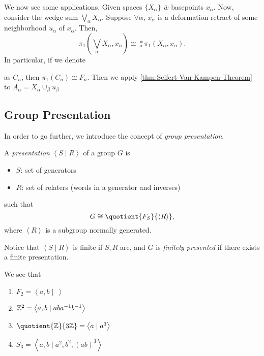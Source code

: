 \begin{eg}
	We now see some applications. Given spaces \(\{X_\alpha \}\) \(\overline{w} \) basepoints \(x_\alpha \). Now, consider
	the wedge sum \(\bigvee\limits_\alpha X_\alpha \). Suppose \(\forall \alpha\), \(x_\alpha \) is a deformation retract of
	some neighborhood \(u_\alpha \) of \(x_\alpha \). Then,
	\[
		\pi _1\left(\bigvee_\alpha X_\alpha , x_\alpha \right) \cong \underset{\alpha }{\ast}\pi _1\left(X_\alpha , x_\alpha \right).
	\]
	In particular, if we denote
	\begin{figure}[H]
		\centering
		\label{fig:eg:Seifert-Van-Kampen-Thm}
	\end{figure}

	as \(C_n\), then \(\pi _1(C_n)\cong F_n\). Then we apply \autoref{thm:Seifert-Van-Kampen-Theorem} to \(A_\alpha = X_\alpha \cup_{\beta }u_\beta \)
\end{eg}

\subsection{Group Presentation}
In order to go further, we introduce the concept of \emph{group presentation}.
\begin{definition}\label{def:group-presentation}
	A \emph{presentation} \(\left< S \mid R \right> \) of a group \(G\) is
	\begin{itemize}
		\item \(S\): set of generators
		\item \(R\): set of relaters (words in a generator and inverses)
	\end{itemize}
	such that
	\[
		G\cong \quotient{F_S}{\left< R \right>},
	\]
	where \(\left< R \right> \) is a subgroup normally generated.

	\par Notice that \(\left< S \mid R \right> \) is finite if \(S, R\) are, and \(G\) is \emph{finitely presented} if
	there exists a finite presentation.
\end{definition}
\begin{eg}
	We see that
	\begin{enumerate}
		\item \(F_2 = \left< a, b \mid\ \right> \)
		\item \(\mathbb{\MakeUppercase{z}} ^2 = \left< a, b \mid aba^{-1} b^{-1}  \right> \)
		\item \(\quotient{\mathbb{\MakeUppercase{z}}}{3\mathbb{\MakeUppercase{z}}} = \left< a \mid a^3 \right> \)
		\item \(S_3 = \left< a, b \mid a^2, b^2, (ab)^3 \right> \)
	\end{enumerate}
\end{eg}

